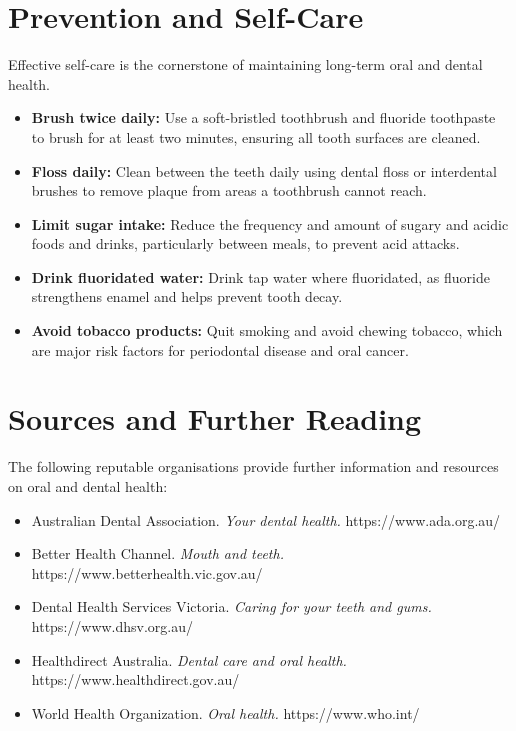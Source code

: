\section*{Prevention and Self-Care}
Effective self-care is the cornerstone of maintaining long-term oral and dental health.
\begin{itemize}
    \item \textbf{Brush twice daily:} Use a soft-bristled toothbrush and fluoride toothpaste to brush for at least two minutes, ensuring all tooth surfaces are cleaned.
    \item \textbf{Floss daily:} Clean between the teeth daily using dental floss or interdental brushes to remove plaque from areas a toothbrush cannot reach.
    \item \textbf{Limit sugar intake:} Reduce the frequency and amount of sugary and acidic foods and drinks, particularly between meals, to prevent acid attacks.
    \item \textbf{Drink fluoridated water:} Drink tap water where fluoridated, as fluoride strengthens enamel and helps prevent tooth decay.
    \item \textbf{Avoid tobacco products:} Quit smoking and avoid chewing tobacco, which are major risk factors for periodontal disease and oral cancer.
\end{itemize}

\section*{Sources and Further Reading}
The following reputable organisations provide further information and resources on oral and dental health:
\begin{itemize}
    \item Australian Dental Association. \textit{Your dental health.} https://www.ada.org.au/
    \item Better Health Channel. \textit{Mouth and teeth.} https://www.betterhealth.vic.gov.au/
    \item Dental Health Services Victoria. \textit{Caring for your teeth and gums.} https://www.dhsv.org.au/
    \item Healthdirect Australia. \textit{Dental care and oral health.} https://www.healthdirect.gov.au/
    \item World Health Organization. \textit{Oral health.} https://www.who.int/
\end{itemize}
